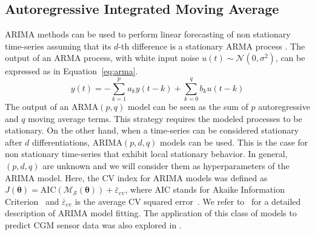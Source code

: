 

\subsection{Autoregressive Integrated Moving Average}
ARIMA methods can be used to perform linear forecasting of non stationary time-series assuming that its $d$-th difference is a stationary ARMA process  \cite{box2015time}. The output of an ARMA process, with white input noise $u(t)\sim\mathcal{N}(0,\sigma^2)$, can be expressed as in Equation~\eqref{eq:arma}.
\begin{equation} \label{eq:arma}
y(t) = -\sum_{k=1}^pa_ky(t-k)+\sum_{k=0}^qb_ku(t-k)
\end{equation}
The output of an ARMA$(p, q)$ model can be seen as the sum of $p$ autoregressive and $q$ moving average terms. This strategy requires the modeled processes to be stationary. On the other hand, when a time-series can be considered stationary after $d$ differentiations, ARIMA$(p, d, q)$ models can be used. 
This is the case for non stationary time-series that exhibit local stationary behavior. In general,  $(p, d, q)$ are unknown and we will consider them as hyperparameters of the ARIMA model.
Here, the CV index for ARIMA models was defined as $J(\bm{\theta})= \text{AIC}(\mathcal{M}_{\mathcal{S}}(\bm{\theta})) + \bar{\varepsilon}_{\text{cv}}$, where AIC stands for Akaike Information Criterion~ \cite{box2015time} and $\bar{\varepsilon}_{\text{cv}}$ is the  average CV squared error~\cite{everitt2006cambridge}.
We refer to~\cite{box2015time} for a detailed description of ARIMA model fitting.
The application of this class of models to predict CGM sensor data was also explored in \cite{sparacino2007glucose,bunescu2013blood}.

